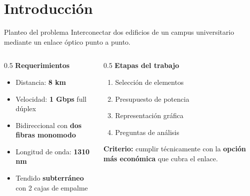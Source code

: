 \documentclass[aspectratio=1610]{beamer}
\begin{document}
\section[Intro]{Introducción}
\begin{frame}{Planteo del problema}
  Interconectar dos edificios de un campus universitario mediante un enlace óptico punto a punto.

  \vspace{0.3cm}
  \begin{columns}[T]
    \begin{column}{0.5\textwidth}
      \textbf{Requerimientos}
      \begin{itemize}
        \item Distancia: \textbf{8 km}
        \item Velocidad: \textbf{1 Gbps} full dúplex
        \item Bidireccional con \textbf{dos fibras monomodo}
        \item Longitud de onda: \textbf{1310 nm}
        \item Tendido \textbf{subterráneo} con 2 cajas de empalme
      \end{itemize}
    \end{column}
    \begin{column}{0.5\textwidth}
      \textbf{Etapas del trabajo}
      \begin{enumerate}
        \item[A.] Selección de elementos
        \item[B.] Presupuesto de potencia
        \item[C.] Representación gráfica
        \item[D.] Preguntas de análisis
      \end{enumerate}
      \vspace{0.2cm}
      \textbf{Criterio:} cumplir técnicamente con la \textbf{opción más económica} que cubra el enlace.
    \end{column}
  \end{columns}
\end{frame}

\end{document}
